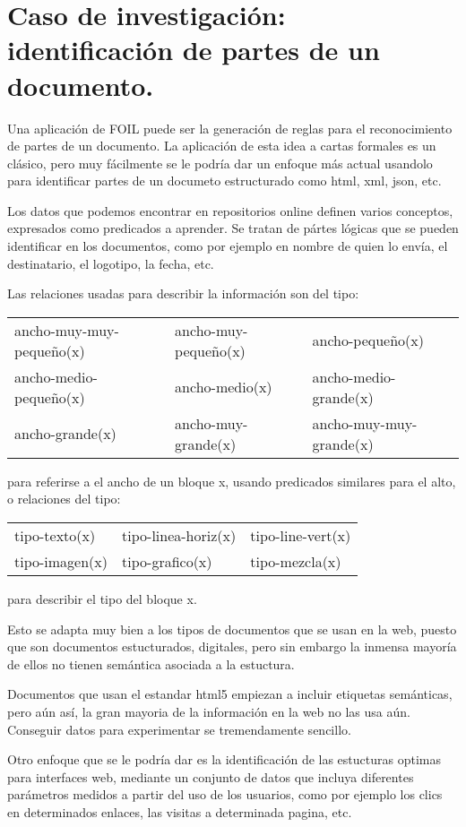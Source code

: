 \section{Caso de investigación: identificación de partes de un documento.}
Una aplicación de FOIL puede ser la generación de reglas para el reconocimiento de partes de un documento. La aplicación de esta idea a cartas formales es un clásico, pero muy fácilmente se le podría dar un enfoque más actual usandolo para identificar partes de un documeto estructurado como html, xml, json, etc.

Los datos que podemos encontrar en repositorios online definen varios conceptos, expresados como predicados a aprender. Se tratan de pártes lógicas que se pueden identificar en los documentos, como por ejemplo en nombre de quien lo envía, el destinatario, el logotipo, la fecha, etc.

Las relaciones usadas para describir la información son del tipo:

\begin{table}
  \setlength{\tabcolsep}{15pt} %
  \begin{tabular}{l l l}
    ancho-muy-muy-pequeño(x) & ancho-muy-pequeño(x) & ancho-pequeño(x) \\
    ancho-medio-pequeño(x) & ancho-medio(x) & ancho-medio-grande(x) \\
    ancho-grande(x) & ancho-muy-grande(x) & ancho-muy-muy-grande(x) \\
  \end{tabular}
\end{table}
para referirse a el ancho de un bloque x, usando predicados similares para el alto, o relaciones del tipo:

\begin{table}
  \setlength{\tabcolsep}{20pt} %
  \begin{tabular}{l l l}
    tipo-texto(x) & tipo-linea-horiz(x) & tipo-line-vert(x) \\
    tipo-imagen(x) & tipo-grafico(x) & tipo-mezcla(x) \\
  \end{tabular}
\end{table}
para describir el tipo del bloque x.

Esto se adapta muy bien a los tipos de documentos que se usan en la web, puesto que son documentos estucturados, digitales, pero sin embargo la inmensa mayoría de ellos no tienen semántica asociada a la estuctura.

Documentos que usan el estandar html5 empiezan a incluir etiquetas semánticas, pero aún así, la gran mayoria de la información en la web no las usa aún. Conseguir datos para experimentar se tremendamente sencillo.

Otro enfoque que se le podría dar es la identificación de las estucturas optimas para interfaces web, mediante un conjunto de datos que incluya diferentes parámetros medidos a partir del uso de los usuarios, como por ejemplo los clics en determinados enlaces, las visitas a determinada pagina, etc.
